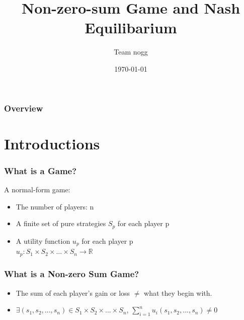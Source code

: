 \documentclass{beamer}
\title[Short title]{Non-zero-sum Game and Nash Equilibarium}
\author{Team nogg}
\institute[SJTU]
{

}
\date{\today}
\begin{document}
\begin{frame}
\titlepage
\end{frame}

\begin{frame}
\frametitle{Overview}
\tableofcontents
\end{frame}

\section{Introductions}
\begin{frame}
\frametitle{What is a Game?}
A normal-form game:\\
\begin{itemize}
\item The {\color{red} number} of players: n
\item A finite {\color{red} set of pure strategies} $S_p$ for each player p
\item A {\color{red} utility function} $u_p$ for each player p\\
        \qquad $u_p : S_1 \times S_2 \times ... \times S_n  \rightarrow \mathbb{R}$\\
\end{itemize}
\end{frame}


\begin{frame}
\frametitle{What is a Non-zero Sum Game?}
\begin{itemize}
\item
The sum of each player's gain or loss $\neq$ what they begin with.
\item
$\exists (s_1,s_2,...,s_n)\in S_1\times S_2 \times ... \times S_n$, $\sum_{i=1}^{n} u_i(s_1,s_2,...,s_n) \neq 0$
\end{itemize}
\end{frame}
\end{document}

